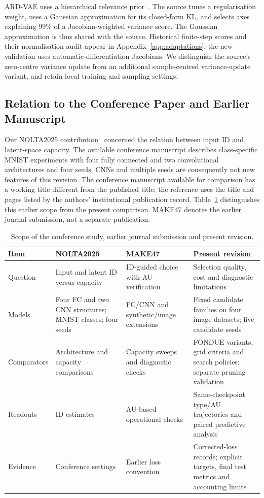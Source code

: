 ARD-VAE uses a hierarchical relevance prior~\cite{saha2025ardvae}.
The source tunes a regularisation weight, uses a Gaussian approximation
for its closed-form KL, and selects axes explaining 99\% of a
Jacobian-weighted variance score. The Gaussian approximation is thus
shared with the source. Historical finite-step scores and their
normalisation audit appear in Appendix~\ref{app:adaptations}; the new
validation uses automatic-differentiation Jacobians. We distinguish the
source's zero-centre variance update from an additional sample-centred
variance-update variant, and retain local training and sampling settings.

\subsection{Relation to the Conference Paper and Earlier Manuscript}
Our NOLTA2025 contribution~\cite{obata2025manifold} concerned the relation
between input ID and latent-space capacity. The available conference
manuscript describes class-specific MNIST experiments with four fully
connected and two convolutional architectures and four seeds. CNNs and
multiple seeds are consequently not new features of this revision.
The conference manuscript available for comparison has a working title
different from the published title; the reference uses the title and
pages listed by the authors' institutional publication record.
Table~\ref{tab:history} distinguishes this earlier scope from the present
comparison. MAKE47 denotes the earlier journal submission, not a separate
publication.

\begin{table}[H]
\caption{Scope of the conference study, earlier journal submission and present revision.}
\label{tab:history}\small
\begin{tabularx}{\textwidth}{lXXX}\toprule
Item & NOLTA2025 & MAKE47 & Present revision \\\midrule
Question & Input and latent ID versus capacity & ID-guided choice with AU verification & Selection quality, cost and diagnostic limitations \\
Models & Four FC and two CNN structures; MNIST classes; four seeds & FC/CNN and synthetic/image extensions & Fixed candidate families on four image datasets; five candidate seeds \\
Comparators & Architecture and capacity comparisons & Capacity sweeps and diagnostic checks & FONDUE variants, grid criteria and search policies; separate pruning validation \\
Readouts & ID estimates & AU-based operational checks & Same-checkpoint type/AU trajectories and paired predictive analysis \\
Evidence & Conference settings & Earlier loss convention & Corrected-loss records; explicit targets, final test metrics and accounting limits \\
\bottomrule\end{tabularx}
\end{table}

